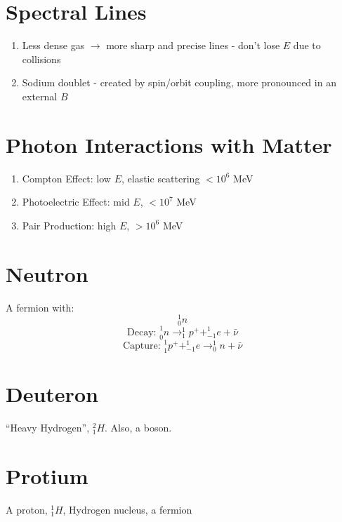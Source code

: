 \documentclass[10pt,a4paper]{article}
\begin{document}
\section{Spectral Lines} %
\label{sec:spectral_lines}
\begin{enumerate}
    \item Less dense gas $\rightarrow$ more sharp and precise lines - don't lose $E$ due to collisions
    \item Sodium doublet - created by spin/orbit coupling, more pronounced in an external $B$ 
\end{enumerate}

\section{Photon Interactions with Matter} %
\label{sec:photon_interactions_with_matter}
\begin{enumerate}
    \item Compton Effect: low $E$, elastic scattering $< 10^6$ MeV 
    \item Photoelectric Effect: mid $E$, $ < 10^7$ MeV
    \item Pair Production: high $E$, $ >10^6$ MeV
\end{enumerate}

\section{Neutron} %
\label{sec:neutron}
A fermion with:
\begin{equation}
    ^1_0n
\end{equation}
\begin{equation}
    \textrm{Decay: }^1_0n \rightarrow ^1_1p^+ + ^1_{-1}e + \bar{\nu}
\end{equation}
\begin{equation}
    \textrm{Capture: }^1_1p^+ + ^1_{-1}e \rightarrow ^1_0n + \bar{\nu}
\end{equation}

\section{Deuteron} %
\label{sec:deuteron}
``Heavy Hydrogen'', $^2_1H$. Also, a boson.

\section{Protium} %
\label{sec:protium}
A proton, $^1_1H$, Hydrogen nucleus, a fermion
\end{document}
